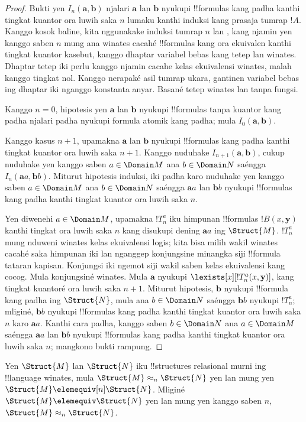 \documentclass[../../../include/open-logic-section]{subfiles}
\begin{document}
\begin{proof}
  Bukti yen $I_n(\mathbf{a},\mathbf{b})$
  njalari $\mathbf{a}$
  lan $\mathbf{b}$ nyukupi
  !!{formula}s kang padha
  kanthi tingkat kuantor
  ora luwih saka $n$
  lumaku kanthi induksi
  kang prasaja tumrap $!A$.
  Kanggo kosok baline,
  kita nggunakake induksi
  tumrap $n$ lan
  ,
  kang njamin yen kanggo
  saben $n$ mung ana
  winates cacahé !!{formula}s
  kang ora ekuivalen
  kanthi tingkat kuantor kasebut, kanggo dhaptar variabel bebas kang tetep lan winates. Dhaptar tetep iki perlu kanggo njamin cacahe kelas ekuivalensi winates, malah kanggo tingkat nol. Kanggo nerapaké asil tumrap ukara, gantinen variabel bebas ing dhaptar iki nganggo konstanta anyar. Basané tetep winates lan tanpa fungsi.

  Kanggo $n=0$, hipotesis yen
  $\mathbf{a}$ lan $\mathbf{b}$
  nyukupi !!{formula}s
  tanpa kuantor kang padha
  njalari padha nyukupi
  formula atomik kang padha;
  mula $I_0(\mathbf{a},\mathbf{b})$.

  Kanggo kasus $n+1$,
  upamakna $\mathbf{a}$
  lan $\mathbf{b}$ nyukupi
  !!{formula}s kang padha
  kanthi tingkat kuantor
  ora luwih saka $n+1$.
  Kanggo nuduhake
  $I_{n+1}(\mathbf{a},\mathbf{b})$,
  cukup nuduhake yen kanggo
  saben $a \in \Domain M$
  ana $b \in \Domain N$
  saéngga $I_n(\mathbf{a}a,\mathbf{b}b)$.
  Miturut hipotesis induksi,
  iki padha karo nuduhake
  yen kanggo saben
  $a \in \Domain M$
  ana $b \in \Domain N$
  saéngga $\mathbf{a}a$
  lan $\mathbf{b}b$
  nyukupi !!{formula}s
  kang padha kanthi
  tingkat kuantor
  ora luwih saka $n$.

  Yen diwenehi $a \in \Domain M$,
  upamakna $!T^a_n$
  iku himpunan !!{formula}s
  $!B(x,\mathbf{y})$
  kanthi tingkat ora luwih saka $n$
  kang disukupi dening
  $\mathbf{a}a$ ing $\Struct{M}$.
  $!T^a_n$ mung nduweni
  winates kelas ekuivalensi logis;
  kita bisa milih wakil
  winates cacahé saka
  himpunan iki lan nganggep
  konjungsine minangka siji
  !!{formula} tataran kapisan.
  Konjungsi iki ngemot siji wakil saben kelas ekuivalensi kang cocog. Mula konjungsiné winates.
  Mula $\mathbf{a}$ nyukupi
  $\lexists[x][!T^a_n(x,\mathbf{y})]$,
  kang tingkat kuantoré
  ora luwih saka $n+1$.
  Miturut hipotesis,
  $\mathbf{b}$ nyukupi
  !!{formula} kang padha
  ing $\Struct{N}$, mula
  ana $b \in \Domain N$
  saéngga $\mathbf{b}b$
  nyukupi $!T^a_n$;
  mliginé, $\mathbf{b}b$
  nyukupi !!{formula}s
  kang padha kanthi
  tingkat kuantor
  ora luwih saka $n$
  karo $\mathbf{a}a$.
  Kanthi cara padha,
  kanggo saben
  $b \in \Domain N$
  ana $a\in \Domain M$
  saéngga $\mathbf{a}a$
  lan $\mathbf{b}b$
  nyukupi !!{formula}s
  kang padha kanthi
  tingkat kuantor
  ora luwih saka $n$;
  mangkono bukti rampung.
\end{proof}

\begin{cor}
  Yen $\Struct{M}$
  lan $\Struct{N}$
  iku !!{structure}s relasional
  murni ing !!{language} winates,
  mula $\Struct{M} \approx_n\Struct{N}$
  yen lan mung yen
  $\Struct{M} \elemequiv[n] \Struct{N}$.
  Mliginé $\Struct{M} \elemequiv
  \Struct{N}$ yen lan mung yen
  kanggo saben $n$,
  $\Struct{M} \approx_n \Struct{N}$.
\end{cor}
\end{document}
